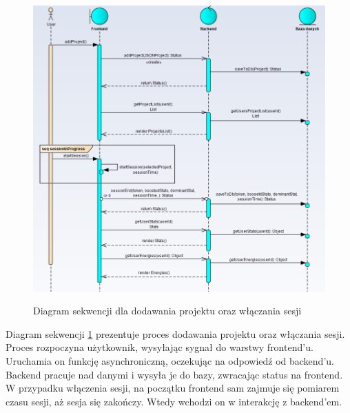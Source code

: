 \documentclass[a4paper,11pt]{report}
\begin{document}
\begin{figure}[H]
	\centering
	\includegraphics[scale=0.6]{sekwencji}\\
	\caption{Diagram sekwencji dla dodawania projektu oraz włączania sesji}
	\label{fig:seq1}
\end{figure}
Diagram sekwencji \ref{fig:seq1} prezentuje proces dodawania projektu oraz włączania sesji. Proces rozpoczyna użytkownik,
 wysyłając sygnał do warstwy frontend'u. Uruchamia on funkcję asynchroniczną, oczekując na odpowiedź od backend'u. 
Backend pracuje nad danymi i wysyła je do bazy, zwracając status na frontend. W przypadku włączenia sesji,
 na początku frontend sam zajmuje się pomiarem czasu sesji, aż sesja się zakończy.
Wtedy wchodzi on w interakcję z backend'em.
\end{document}
